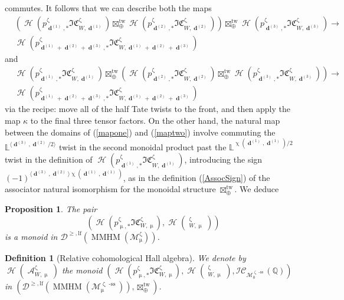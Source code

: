 \documentclass[a4paper,10pt]{amsart}
\renewcommand{\zeta}{\upzeta}
\renewcommand{\chi}{\upchi}
\renewcommand{\mu}{\upmu}
\newtheorem{definition}[theorem]{Definition}
\newtheorem{proposition}[theorem]{Proposition}
\newcommand{\LL}{\mathbb{L}}
\newcommand{\Msp}{\mathcal{M}}
\newcommand{\ICS}{\mathcal{IC}}
\newcommand{\ICSt}{\mathfrak{IC}}
\DeclareMathOperator{\sst}{-ss}
\DeclareMathOperator{\tw}{tw}
\DeclareMathOperator{\MMHM}{MMHM}
\DeclareMathOperator{\ms}{\tilde{\ast}}
\DeclareMathOperator{\dd}{\mathbf{d}}
\DeclareMathOperator{\Ho}{\mathcal{H}}
\DeclareMathOperator{\Coha}{\mathcal{A}}
\newcommand{\Dulf}{\mathcal{D}^{\geq, \mathrm{lf}}}
\begin{document}
commutes.  It follows that we can describe both the maps
\begin{align}
\label{mapone}
&\left(\Ho\left(p^{\zeta}_{\dd^{(1)},*}\ICSt_{W,\dd^{(1)}}^{\zeta}\right)\boxtimes_{\oplus}^{\tw}\Ho\left(p^{\zeta}_{\dd^{(2)},*}\ICSt_{W,\dd^{(2)}}^{\zeta}\right)\right)\boxtimes_{\oplus}^{\tw}\Ho\left(p^{\zeta}_{\dd^{(3)},*}\ICSt_{W,\dd^{(3)}}^{\zeta}\right)\rightarrow \\&\Ho\left(p^{\zeta}_{\dd^{(1)}+\dd^{(2)}+\dd^{(3)},*}\ICSt_{W,\dd^{(1)}+\dd^{(2)}+\dd^{(3)}}^{\zeta}\right)\nonumber
\end{align}
and
\begin{align}
\label{maptwo}
&\Ho\left(p^{\zeta}_{\dd^{(1)},*}\ICSt_{W,\dd^{(1)}}^{\zeta}\right)\boxtimes_{\oplus}^{\tw}\left(\Ho\left(p^{\zeta}_{\dd^{(2)},*}\ICSt_{W,\dd^{(2)}}^{\zeta}\right)\boxtimes_{\oplus}^{\tw}\Ho\left(p^{\zeta}_{\dd^{(3)},*}\ICSt_{W,\dd^{(3)}}^{\zeta}\right)\right)\rightarrow \\&\Ho\left(p^{\zeta}_{\dd^{(1)}+\dd^{(2)}+\dd^{(3)},*}\ICSt_{W,\dd^{(1)}+\dd^{(2)}+\dd^{(3)}}^{\zeta}\right)
\end{align}
via the recipe: move all of the half Tate twists to the front, and then apply the map $\kappa$ to the final three tensor factors.  On the other hand, the natural map between the domains of (\ref{mapone}) and (\ref{maptwo}) involve commuting the $\LL^{\langle \dd^{(3)},\dd^{(2)}/2\rangle}$ twist in the second monoidal product past the $\LL^{\chi(\dd^{(1)},\dd^{(1)})/2}$ twist in the definition of $\Ho\left(p^{\zeta}_{\dd^{(1)},*}\ICSt_{W,\dd^{(1)}}^{\zeta}\right)$, introducing the sign $(-1)^{\langle \dd^{(3)},\dd^{(2)}\rangle\chi(\dd^{(1)},\dd^{(1)})}$, as in the definition (\ref{AssocSign}) of the associator natural isomorphism for the monoidal structure $\boxtimes_{\oplus}^{\tw}$.  We deduce
\begin{proposition}
The pair 
\[
\left(\Ho\left(p^{\zeta}_{\mu,*}\ICSt_{W,\mu}^{\zeta}\right),\Ho\left(\ms^{\zeta}_{W,\mu}\right)\right)
\]
is a monoid in $\Dulf(\MMHM(\Msp^{\zeta}_{\mu}))$.
\end{proposition}

\begin{definition}[Relative cohomological Hall algebra]
We denote by $\Ho(\Coha_{W,\mu}^{\zeta})$ the monoid $\left(\Ho\left(p_{\mu,*}^{\zeta}\ICSt_{W,\mu}^{\zeta}\right),\Ho(\ms^{\zeta}_{W,\mu}),\ICS_{\Msp_0^{\zeta\sst}}(\mathbb{Q})\right)$ in $\left(\Dulf(\MMHM(\Msp_{\mu}^{\zeta\sst})),\boxtimes^{\tw}_{\oplus}\right)$.
\end{definition}
\end{document}
